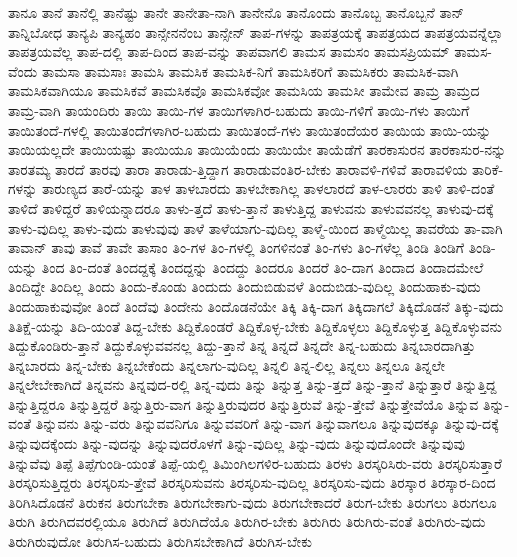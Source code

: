 {ತಾನೂ
ತಾನೆ
ತಾನೆಲ್ಲಿ
ತಾನೆಷ್ಟು
ತಾನೇ
ತಾನೇತಾ-ನಾಗಿ
ತಾನೇನೊ
ತಾನೊಂದು
ತಾನೊಬ್ಬ
ತಾನೊಬ್ಬನೆ
ತಾನ್
ತಾನ್ನಿಬೋಧ
ತಾನ್ಯಪಿ
ತಾನ್ಯಹಂ
ತಾನ್ಸೇನನೆಂಬ
ತಾನ್ಸೇನ್
ತಾಪ-ಗಳನ್ನು
ತಾಪತ್ರಯಕ್ಕೆ
ತಾಪತ್ರಯದ
ತಾಪತ್ರಯವನ್ನೆಲ್ಲಾ
ತಾಪತ್ರಯವೆಲ್ಲ
ತಾಪ-ದಲ್ಲಿ
ತಾಪ-ದಿಂದ
ತಾಪ-ವನ್ನು
ತಾಪವಾಗಲಿ
ತಾಮಸ
ತಾಮಸಂ
ತಾಮಸಪ್ರಿಯಮ್
ತಾಮಸ-ವೆಂದು
ತಾಮಸಾ
ತಾಮಸಾಃ
ತಾಮಸಿ
ತಾಮಸಿಕ
ತಾಮಸಿಕ-ನಿಗೆ
ತಾಮಸಿಕರಿಗೆ
ತಾಮಸಿಕರು
ತಾಮಸಿಕ-ವಾಗಿ
ತಾಮಸಿಕವಾಗಿಯೂ
ತಾಮಸಿಕವೆ
ತಾಮಸಿಕವೊ
ತಾಮಸಿಕವೋ
ತಾಮಸಿಯ
ತಾಮಸೀ
ತಾಮೇವ
ತಾಮ್ರ
ತಾಮ್ರದ
ತಾಮ್ರ-ವಾಗಿ
ತಾಯಂದಿರು
ತಾಯಿ
ತಾಯಿ-ಗಳ
ತಾಯಿಗಳಾಗಿರ-ಬಹುದು
ತಾಯಿ-ಗಳಿಗೆ
ತಾಯಿ-ಗಳು
ತಾಯಿಗೆ
ತಾಯಿತಂದೆ-ಗಳಲ್ಲಿ
ತಾಯಿತಂದೆಗಳಾಗಿರ-ಬಹುದು
ತಾಯಿತಂದೆ-ಗಳು
ತಾಯಿತಂದೆಯರ
ತಾಯಿಯ
ತಾಯಿ-ಯನ್ನು
ತಾಯಿಯಲ್ಲದೇ
ತಾಯಿಯಷ್ಟು
ತಾಯಿಯೂ
ತಾಯಿಯೆಂದು
ತಾಯಿಯೇ
ತಾಯೆಡೆಗೆ
ತಾರಕಾಸುರನ
ತಾರಕಾಸುರ-ನನ್ನು
ತಾರತಮ್ಯ
ತಾರದೆ
ತಾರವು
ತಾರಾ
ತಾರಾಡು-ತ್ತಿದ್ದಾಗ
ತಾರಾಡುವಂತಿರ-ಬೇಕು
ತಾರಾವಳಿ-ಗಳಿವೆ
ತಾರಾವಳಿಯ
ತಾರಿಕೆ-ಗಳನ್ನು
ತಾರುಣ್ಯದ
ತಾರೆ-ಯನ್ನು
ತಾಳ
ತಾಳಬಾರದು
ತಾಳಬೇಕಾಗಿಲ್ಲ
ತಾಳಲಾರದೆ
ತಾಳ-ಲಾರರು
ತಾಳಿ
ತಾಳಿ-ದಂತೆ
ತಾಳಿದೆ
ತಾಳಿದ್ದರೆ
ತಾಳಿಯನ್ನಾದರೂ
ತಾಳು-ತ್ತದೆ
ತಾಳು-ತ್ತಾನೆ
ತಾಳುತ್ತಿದ್ದ
ತಾಳುವನು
ತಾಳುವವನಲ್ಲ
ತಾಳುವು-ದಕ್ಕೆ
ತಾಳು-ವುದಿಲ್ಲ
ತಾಳು-ವುದು
ತಾಳುವುವು
ತಾಳೆ
ತಾಳೆಯಾಗು-ವುದಿಲ್ಲ
ತಾಳ್ಮೆ-ಯಿಂದ
ತಾಳ್ಮೆಯಿಲ್ಲ
ತಾವರೆಯ
ತಾ-ವಾಗಿ
ತಾವಾನ್
ತಾವು
ತಾವೆ
ತಾವೇ
ತಾಸಾಂ
ತಿಂ-ಗಳ
ತಿಂ-ಗಳಲ್ಲಿ
ತಿಂಗಳಿನಂತೆ
ತಿಂ-ಗಳು
ತಿಂ-ಗಳೆಲ್ಲ
ತಿಂಡಿ
ತಿಂಡಿಗೆ
ತಿಂಡಿ-ಯನ್ನು
ತಿಂದ
ತಿಂ-ದಂತೆ
ತಿಂದದ್ದಕ್ಕೆ
ತಿಂದದ್ದನ್ನು
ತಿಂದದ್ದು
ತಿಂದರೂ
ತಿಂದರೆ
ತಿಂ-ದಾಗ
ತಿಂದಾದ
ತಿಂದಾದಮೇಲೆ
ತಿಂದಿದ್ದೇ
ತಿಂದಿಲ್ಲ
ತಿಂದು
ತಿಂದು-ಕೊಂಡು
ತಿಂದುದು
ತಿಂದುಬಿಡುವಳೆ
ತಿಂದುಬಿಡು-ವುದಿಲ್ಲ
ತಿಂದುಹಾಕು-ವುದು
ತಿಂದುಹಾಕುವುವೋ
ತಿಂದೆ
ತಿಂದೆವು
ತಿಂದೇನು
ತಿಂದೊಡನೆಯೇ
ತಿಕ್ಕಿ
ತಿಕ್ಕಿ-ದಾಗ
ತಿಕ್ಕಿದಾಗಲೆ
ತಿಕ್ಕಿದೊಡನೆ
ತಿಕ್ಕು-ವುದು
ತಿತಿಕ್ಷೆ-ಯನ್ನು
ತಿದಿ-ಯಂತೆ
ತಿದ್ದ-ಬೇಕು
ತಿದ್ದಿಕೊಂಡರೆ
ತಿದ್ದಿಕೊಳ್ಳ-ಬೇಕು
ತಿದ್ದಿಕೊಳ್ಳಲು
ತಿದ್ದಿಕೊಳ್ಳುತ್ತ
ತಿದ್ದಿಕೊಳ್ಳುವನು
ತಿದ್ದುಕೊಂಡಿರು-ತ್ತಾನೆ
ತಿದ್ದುಕೊಳ್ಳುವವನಲ್ಲ
ತಿದ್ದು-ತ್ತಾನೆ
ತಿನ್ನ
ತಿನ್ನದೆ
ತಿನ್ನದೇ
ತಿನ್ನ-ಬಹುದು
ತಿನ್ನಬಾರದಾಗಿತ್ತು
ತಿನ್ನಬಾರದು
ತಿನ್ನ-ಬೇಕು
ತಿನ್ನಬೇಕೆಂದು
ತಿನ್ನಲಾಗು-ವುದಿಲ್ಲ
ತಿನ್ನಲಿ
ತಿನ್ನ-ಲಿಲ್ಲ
ತಿನ್ನಲು
ತಿನ್ನಲೂ
ತಿನ್ನಲೇ
ತಿನ್ನಲೇಬೇಕಾಗಿದೆ
ತಿನ್ನವನು
ತಿನ್ನವುದ-ರಲ್ಲಿ
ತಿನ್ನ-ವುದು
ತಿನ್ನು
ತಿನ್ನುತ್ತ
ತಿನ್ನು-ತ್ತದೆ
ತಿನ್ನು-ತ್ತಾನೆ
ತಿನ್ನುತ್ತಾರೆ
ತಿನ್ನುತ್ತಿದ್ದ
ತಿನ್ನುತ್ತಿದ್ದರೂ
ತಿನ್ನುತ್ತಿದ್ದರೆ
ತಿನ್ನುತ್ತಿರು-ವಾಗ
ತಿನ್ನುತ್ತಿರುವುದರ
ತಿನ್ನುತ್ತಿರುವೆ
ತಿನ್ನು-ತ್ತೇವೆ
ತಿನ್ನುತ್ತೇವೆಯೊ
ತಿನ್ನುವ
ತಿನ್ನು-ವಂತೆ
ತಿನ್ನುವನು
ತಿನ್ನು-ವರು
ತಿನ್ನುವವನಿಗೂ
ತಿನ್ನುವವರಿಗೆ
ತಿನ್ನು-ವಾಗ
ತಿನ್ನುವಾಗಲೂ
ತಿನ್ನುವುದಕ್ಕೂ
ತಿನ್ನುವು-ದಕ್ಕೆ
ತಿನ್ನುವುದಕ್ಕೆಂದು
ತಿನ್ನು-ವುದನ್ನು
ತಿನ್ನುವುದರೊಳಗೆ
ತಿನ್ನು-ವುದಿಲ್ಲ
ತಿನ್ನು-ವುದು
ತಿನ್ನುವುದೊಂದೇ
ತಿನ್ನುವುವು
ತಿನ್ನುವೆವು
ತಿಪ್ಪೆ
ತಿಪ್ಪೆಗುಂಡಿ-ಯಂತೆ
ತಿಪ್ಪೆ-ಯಲ್ಲಿ
ತಿಮಿಂಗಿಲಗಳಿರ-ಬಹುದು
ತಿರಳು
ತಿರಸ್ಕರಿಸಿರು-ವರು
ತಿರಸ್ಕರಿಸುತ್ತಾರೆ
ತಿರಸ್ಕರಿಸುತ್ತಿದ್ದರು
ತಿರಸ್ಕರಿಸು-ತ್ತೇವೆ
ತಿರಸ್ಕರಿಸುವನು
ತಿರಸ್ಕರಿಸು-ವುದಿಲ್ಲ
ತಿರಸ್ಕರಿಸು-ವುದು
ತಿರಸ್ಕಾರ
ತಿರಸ್ಕಾರ-ದಿಂದ
ತಿರಿಗಿಸಿದೊಡನೆ
ತಿರುಕನ
ತಿರುಗಬೇಕಾ
ತಿರುಗಬೇಕಾಗು-ವುದು
ತಿರುಗಬೇಕಾದರೆ
ತಿರುಗ-ಬೇಕು
ತಿರುಗಲು
ತಿರುಗಲೂ
ತಿರುಗಿ
ತಿರುಗಿದವರಲ್ಲಿಯೂ
ತಿರುಗಿದೆ
ತಿರುಗಿದೆಯೊ
ತಿರುಗಿರ-ಬೇಕು
ತಿರುಗಿರು
ತಿರುಗಿರು-ವಂತೆ
ತಿರುಗಿರು-ವುದು
ತಿರುಗಿರುವುದೋ
ತಿರುಗಿಸ-ಬಹುದು
ತಿರುಗಿಸಬೇಕಾಗಿದೆ
ತಿರುಗಿಸ-ಬೇಕು
}
